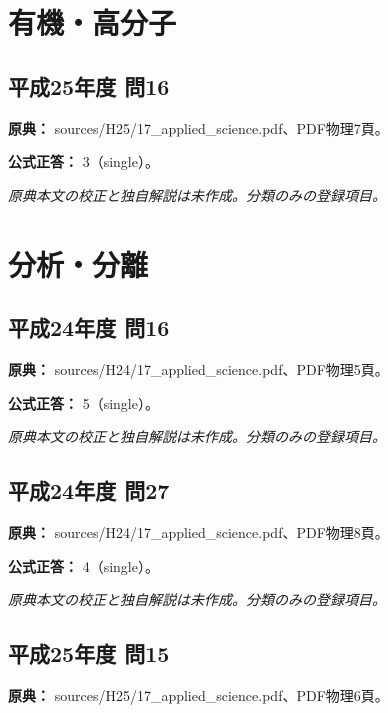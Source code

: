 \section{有機・高分子}

\subsection{平成25年度 問16}
\label{q:h25-reg-applied-16}

\noindent\textbf{原典：} sources/H25/17\_applied\_science.pdf、PDF物理7頁。

\textbf{公式正答：} 3（single）。

\par\textit{原典本文の校正と独自解説は未作成。分類のみの登録項目。}

\section{分析・分離}

\subsection{平成24年度 問16}
\label{q:h24-reg-applied-16}

\noindent\textbf{原典：} sources/H24/17\_applied\_science.pdf、PDF物理5頁。

\textbf{公式正答：} 5（single）。

\par\textit{原典本文の校正と独自解説は未作成。分類のみの登録項目。}

\subsection{平成24年度 問27}
\label{q:h24-reg-applied-27}

\noindent\textbf{原典：} sources/H24/17\_applied\_science.pdf、PDF物理8頁。

\textbf{公式正答：} 4（single）。

\par\textit{原典本文の校正と独自解説は未作成。分類のみの登録項目。}

\subsection{平成25年度 問15}
\label{q:h25-reg-applied-15}

\noindent\textbf{原典：} sources/H25/17\_applied\_science.pdf、PDF物理6頁。


